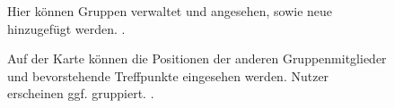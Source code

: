\documentclass[parskip=full,11pt]{scrartcl}
\begin{document}
\begin{figure}[hb]
	\caption{\label{fig:groups}
		Hier können Gruppen verwaltet und angesehen, sowie neue hinzugefügt werden.
		.
	}
\end{figure}

\begin{figure}[hb]
		\caption{\label{fig:map}
			Auf der Karte können die Positionen der anderen Gruppenmitglieder und bevorstehende 
			Treffpunkte eingesehen werden. Nutzer erscheinen ggf. gruppiert.
			.
		}
\end{figure}
\end{document}
